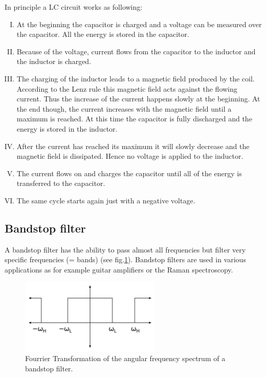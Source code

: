 \documentclass{article}
\begin{document}
In principle a LC circuit works as following:
\begin{enumerate}[I.]
    \item At the beginning the capacitor is charged and a voltage can be measured over the capacitor. All the energy is stored in the capacitor.
    \item Because of the voltage, current flows from the capacitor to the inductor and the inductor is charged.
    \item The charging of the inductor leads to a magnetic field produced by the coil. According to the Lenz rule this magnetic field acts against the flowing current. Thus the increase of the current happens slowly at the beginning. At the end though, the current increases with the magnetic field until a maximum is reached. At this time the capacitor is fully discharged and the energy is stored in the inductor.
    \item After the current has reached its maximum it will slowly decrease and the magnetic field is dissipated. Hence no voltage is applied to the inductor. 
    \item The current flows on and charges the capacitor until all of the energy is transferred to the capacitor. 
    \item The same cycle starts again just with a negative voltage.
\end{enumerate}

\subsection{Bandstop filter}
A bandstop filter has the ability to pass almost all frequencies but filter very specific frequencies (= bands) (see fig.\ref{fig:bsf}). Bandstop filters are used in various applications as for example guitar amplifiers or the Raman spectroscopy.

\begin{figure}[!ht]
    \centering
    \includegraphics[width=0.6\textwidth]{images/2880px-Ideal_Band_Stop_Filter_Transfer_Function.svg.png}
    \caption{Fourrier Transformation of the angular frequency spectrum of a bandstop filter.}
    \label{fig:bsf}
\end{figure}
\end{document}

